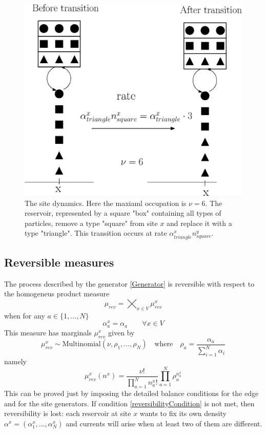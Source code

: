 \documentclass[11pt]{article}
\numberwithin{equation}{section}
\numberwithin{equation}{subsection}
\newcommand{\twoj}{\nu}
\begin{document}
\begin{figure}
    \centering
    \includegraphics[scale=0.4]{BoundaryStirring.eps}
    \caption{The site dynamics. Here the maxiaml occupation is $\nu=6$. The reservoir, represented by a square "box" containing all types of particles, remove a type "square" from site $x$ and replace it with a type "triangle". This transition occurs at rate $\alpha_{triangle}^{x}n_{square}^{y}$.}
    \label{fig:2}
\end{figure}
\subsection{Reversible measures}
The process described by the generator \eqref{Generator} is reversible with respect to the homogeneus product measure \begin{equation}\label{reversibleMeasure}
\mu_{rev}=\bigtimes_{x\in V}\mu_{rev}^{x}
\end{equation}
when for any $a\in\{1,\ldots,N\}$
\begin{equation}\label{reversibilityCondition}
\alpha_{a}^{x}=\alpha_{a}\qquad \forall x\in V
\end{equation}
This measure has marginals $\mu_{rev}^{x}$ given by 
\begin{equation}
 \mu^{x}_{rev}\sim \text{Multinomial}\left(\twoj,\rho_{1},\ldots,\rho_{N}\right)\quad \text{where}\quad \rho_{a}=\frac{\alpha_{a}}{\sum_{i=1}^{N}\alpha_{i}}
\end{equation}
namely
\begin{equation}
\mu_{rev}^{x}(n^{x})=\frac{\nu!}{\prod_{a=1}^{N}n_{a}^{x}!}\prod_{a=1}^{N}\rho_{a}^{n_{a}^{x}}
\end{equation}
This can be proved just by imposing the detailed balance conditions for the edge and for the site generators. If condition \eqref{reversibilityCondition} is not met, then reversibility is lost: each reservoir at site $x$ wants to fix its own density $\alpha^{x}=(\alpha_{1}^{x},\ldots,\alpha_{N}^{x})$ and currents will arise when at least two of them are different. 
\end{document}
